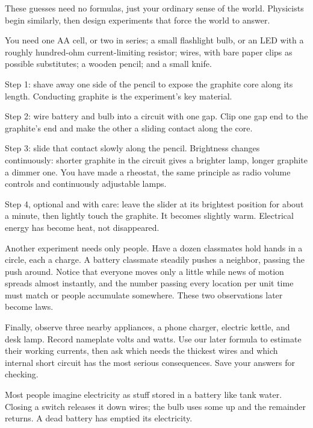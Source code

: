 These guesses need no formulas, just your ordinary sense of the world. Physicists begin similarly, then design experiments that force the world to answer.


\begin{experiment}
You need one AA cell, or two in series; a small flashlight bulb, or an LED with a roughly hundred-ohm current-limiting resistor; wires, with bare paper clips as possible substitutes; a wooden pencil; and a small knife.

Step 1: shave away one side of the pencil to expose the graphite core along its length. Conducting graphite is the experiment's key material.

Step 2: wire battery and bulb into a circuit with one gap. Clip one gap end to the graphite's end and make the other a sliding contact along the core.

Step 3: slide that contact slowly along the pencil. Brightness changes continuously: shorter graphite in the circuit gives a brighter lamp, longer graphite a dimmer one. You have made a rheostat, the same principle as radio volume controls and continuously adjustable lamps.

Step 4, optional and with care: leave the slider at its brightest position for about a minute, then lightly touch the graphite. It becomes slightly warm. Electrical energy has become heat, not disappeared.
\end{experiment}

Another experiment needs only people. Have a dozen classmates hold hands in a circle, each a charge. A battery classmate steadily pushes a neighbor, passing the push around. Notice that everyone moves only a little while news of motion spreads almost instantly, and the number passing every location per unit time must match or people accumulate somewhere. These two observations later become laws.

Finally, observe three nearby appliances, a phone charger, electric kettle, and desk lamp. Record nameplate volts and watts. Use our later formula to estimate their working currents, then ask which needs the thickest wires and which internal short circuit has the most serious consequences. Save your answers for checking.


Most people imagine electricity as stuff stored in a battery like tank water. Closing a switch releases it down wires; the bulb uses some up and the remainder returns. A dead battery has emptied its electricity.

